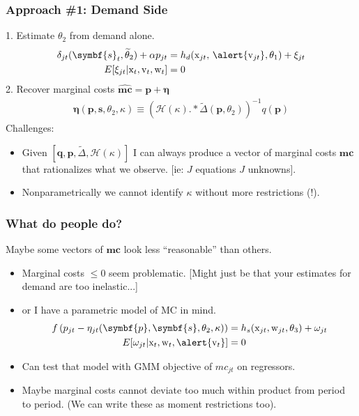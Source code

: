 \documentclass[aspectratio=169,10pt]{beamer}
\begin{document}
\begin{frame}
\frametitle{Approach \#1: Demand Side}
1. Estimate $\theta_2$ from demand alone.
\begin{align*}
\delta_{jt}(\symbf{s}_t,\widetilde{\theta}_2) + \alpha p_{jt} &= h_d(\textrm{x}_{jt}, \, \alert{\textrm{v}_{jt}},\theta_1)  + \xi_{jt} \\
E[\xi_{jt} | \textrm{x}_{t}, \textrm{v}_{t}, \textrm{w}_{t}] &=0
\end{align*}
2. Recover marginal costs $\widehat{\symbf{mc}} = \symbf{p} + \symbf{\eta}$
\begin{align*}
\symbf{\eta}(\symbf{p},\symbf{s},\theta_2,\kappa) \equiv \left(\mathcal{H}(\kappa).*\tilde{\Delta}(\symbf{p},\theta_2) \right)^{-1} q(\symbf{p})
\end{align*}
\vspace{-0.2cm}
Challenges:
\begin{itemize}
\item Given $[\symbf{q},\symbf{p},\tilde{\Delta},\mathcal{H}(\kappa)]$ I can always produce a vector of marginal costs $\symbf{mc}$ that rationalizes what we observe. [ie: $J$ equations $J$ unknowns].
\item Nonparametrically we cannot identify $\kappa$ without more restrictions (!).
\end{itemize}
\end{frame}



\begin{frame}\frametitle{What do people do?}
Maybe some vectors of $\symbf{mc}$ look less ``reasonable'' than others.
\begin{itemize}
\item Marginal costs $\leq 0$ seem problematic.
[Might just be that your estimates for demand are too inelastic...]
\item or I have a parametric model of MC in mind. 
\begin{align*}
 f \left( p_{jt} - \eta_{jt}(\symbf{p},\symbf{s},\theta_2,\kappa) \right) &= h_s(\textrm{x}_{jt}, \textrm{w}_{jt},\theta_3) + \omega_{jt}\\
 E[\omega_{jt} | \textrm{x}_{t}, \textrm{w}_{t}, \alert{\textrm{v}_{t}}]&=0
\end{align*}
\item Can test that model with GMM objective of $mc_{jt}$ on regressors.
\item Maybe marginal costs cannot deviate too much within product from period to period. (We can write these as moment restrictions too).
\end{itemize}
\end{frame}
\end{document}
